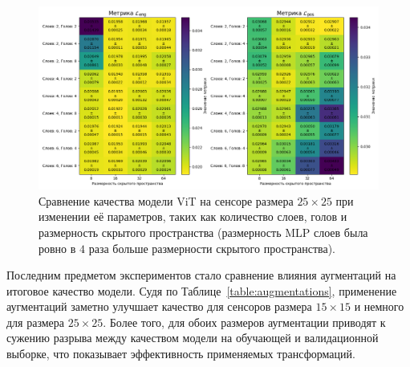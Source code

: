 \documentclass[a4paper,12pt]{extarticle}
\begin{document}
\begin{figure}[t]
    \centering
    \includegraphics[width=1.0\textwidth]{graphics/exp4_model_params_std.png}
    \caption{Сравнение качества модели \textsf{ViT} на сенсоре размера $25 \times 25$ при изменении её параметров, таких как количество слоев, голов и размерность скрытого пространства (размерность MLP слоев была ровно в $4$ раза больше размерности скрытого пространства).}
    \label{graph:model_params}
\end{figure}

Последним предметом экспериментов стало сравнение влияния аугментаций на итоговое качество модели. Судя по Таблице~\ref{table:augmentations}, применение аугментаций заметно улучшает качество для сенсоров размера $15 \times 15$ и немного для размера $25 \times 25$. Более того, для обоих размеров аугментации приводят к сужению разрыва между качеством модели на обучающей и валидационной выборке, что показывает эффективность применяемых трансформаций.
\end{document}
